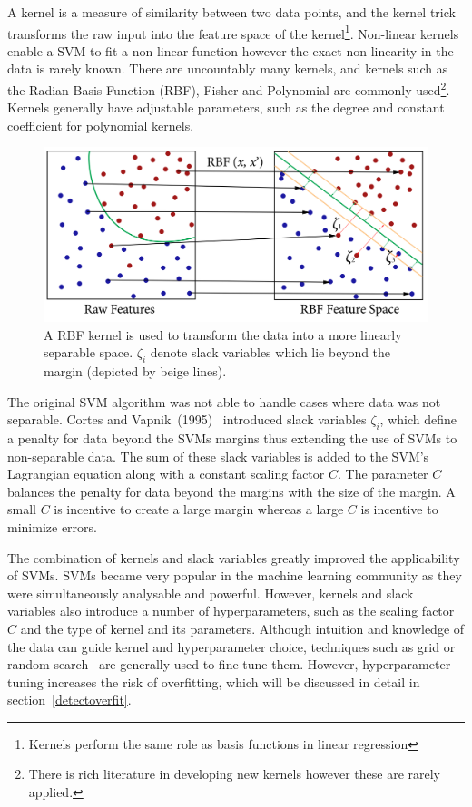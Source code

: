 \documentclass[12pt, twoside]{book}
\begin{document}
A kernel is a measure of similarity between two data points, and the kernel trick transforms the raw input into the feature space of the kernel\footnote{Kernels perform the same role as basis functions in linear regression}. Non-linear kernels enable a SVM to fit a non-linear function however the exact non-linearity in the data is rarely known. There are uncountably many kernels, and kernels such as the Radian Basis Function (RBF), Fisher and Polynomial are commonly used\footnote{There is rich literature in developing new kernels however these are rarely applied.}. Kernels generally have adjustable parameters, such as the degree and constant coefficient for polynomial kernels. 

\begin{figure}[h]
	\label{svm}
	\centering\includegraphics[width=0.8\linewidth]{svm.png}
	\caption{A RBF kernel is used to transform the data into a more linearly separable space. $\zeta_i$ denote slack variables which lie beyond the margin (depicted by beige lines). }
\end{figure}

The original SVM algorithm was not able to handle cases where data was not separable. Cortes and Vapnik~(1995)~\cite{svmsoftmargin} introduced slack variables $\zeta_i$, which define a penalty for data beyond the SVMs margins thus extending the use of SVMs to non-separable data. The sum of these slack variables is added to the SVM's Lagrangian equation along with a constant scaling factor $C$. The parameter $C$ balances the penalty for data beyond the margins with the size of the margin. A small $C$ is incentive to create a large margin whereas a large $C$ is incentive to minimize errors.

The combination of kernels and slack variables greatly improved the applicability of SVMs. SVMs became very popular in the machine learning community as they were simultaneously analysable and powerful. However, kernels and slack variables also introduce a number of hyperparameters, such as the scaling factor $C$ and the type of kernel and its parameters. Although intuition and knowledge of the data can guide kernel and hyperparameter choice, techniques such as grid or random search~\cite{gridsearch} are generally used to fine-tune them. However, hyperparameter tuning increases the risk of overfitting, which will be discussed in detail in section~\ref{detectoverfit}. 
\end{document}
